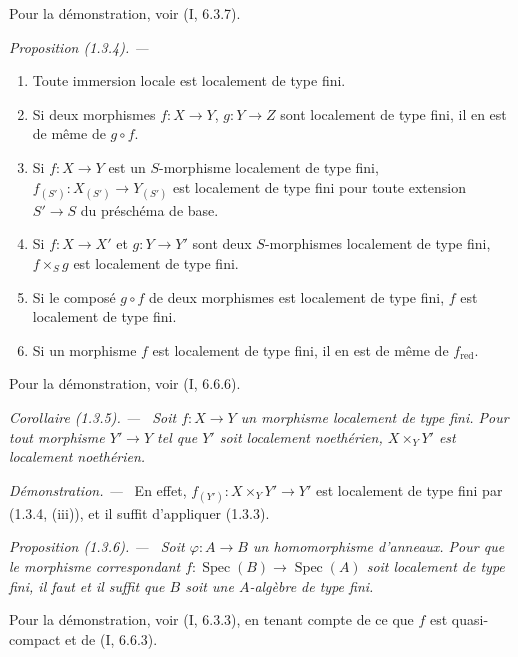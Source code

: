 \documentclass[10pt,oneside]{book}
\makeatletter
\newcommand{\setmanualcurrentlabel}[1]{\def\@currentlabel{#1}}
\newenvironment{proposition}[1][]{%
  \setmanualcurrentlabel{#1}\par\medskip\noindent\itshape Proposition (#1). ---\ }{\par}
\newenvironment{corollary}[1][]{%
  \setmanualcurrentlabel{#1}\par\medskip\noindent\itshape Corollaire (#1). ---\ }{\par}
\newenvironment{proof}{%
  \par\medskip\noindent\textit{Démonstration. ---\ }}{\par}
\makeatother
\begin{document}
Pour la démonstration, voir (I, 6.3.7).

\begin{proposition}[1.3.4]
\label{IV.1.3.4-fr}
\begin{enumerate}
  \item[(i)] Toute immersion locale est localement de type fini.
  \item[(ii)] Si deux morphismes $f:X\to Y$, $g:Y\to Z$ sont localement de
  type fini, il en est de même de $g\circ f$.
  \item[(iii)] Si $f:X\to Y$ est un $S$-morphisme localement de type fini,
  $f_{(S')}:X_{(S')}\to Y_{(S')}$ est localement de type fini pour toute
  extension $S'\to S$ du préschéma de base.
  \item[(iv)] Si $f:X\to X'$ et $g:Y\to Y'$ sont deux $S$-morphismes
  localement de type fini, $f\times_Sg$ est localement de type fini.
  \item[(v)] Si le composé $g\circ f$ de deux morphismes est localement de
  type fini, $f$ est localement de type fini.
  \item[(vi)] Si un morphisme $f$ est localement de type fini, il en est de
  même de $f_{\mathrm{red}}$.
\end{enumerate}
\end{proposition}

Pour la démonstration, voir (I, 6.6.6).

\begin{corollary}[1.3.5]
\label{IV.1.3.5-fr}
Soit $f:X\to Y$ un morphisme localement de type fini. Pour tout morphisme
$Y'\to Y$ tel que $Y'$ soit localement noethérien, $X\times_YY'$ est
localement noethérien.
\end{corollary}

\begin{proof}
En effet, $f_{(Y')}:X\times_YY'\to Y'$ est localement de type fini par
(1.3.4, (iii)), et il suffit d'appliquer (1.3.3).
\end{proof}

\begin{proposition}[1.3.6]
\label{IV.1.3.6-fr}
Soit $\varphi:A\to B$ un homomorphisme d'anneaux. Pour que le morphisme
correspondant $f:\operatorname{Spec}(B)\to\operatorname{Spec}(A)$ soit localement de type fini, il faut et
il suffit que $B$ soit une $A$-algèbre de type fini.
\end{proposition}

Pour la démonstration, voir (I, 6.3.3), en tenant compte de ce que $f$ est
quasi-compact et de (I, 6.6.3).
\end{document}
